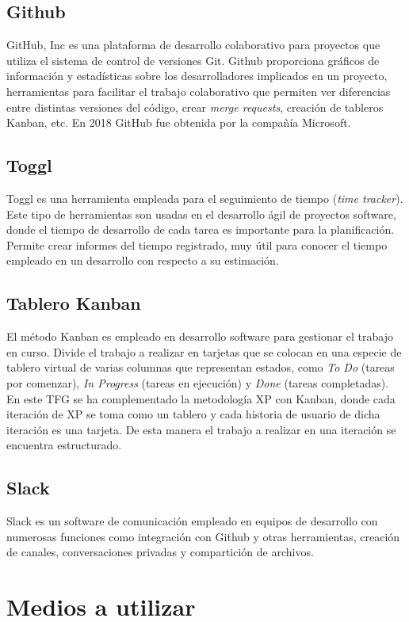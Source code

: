 \subsection{Github}
GitHub, Inc es una plataforma de desarrollo colaborativo para proyectos que utiliza el sistema de control de versiones Git. Github proporciona gráficos de información y estadísticas sobre los desarrolladores implicados en un proyecto, herramientas para facilitar el trabajo colaborativo que permiten ver diferencias entre distintas versiones del código, crear \textit{merge requests}, creación de tableros Kanban, etc. En 2018 GitHub fue obtenida por la compañía Microsoft.
\subsection{Toggl}
Toggl es una herramienta empleada para el seguimiento de tiempo (\textit{time tracker}). Este tipo de herramientas son usadas en el desarrollo ágil de proyectos software, donde el tiempo de desarrollo de cada tarea es importante para la planificación. Permite crear informes del tiempo registrado, muy útil para conocer el tiempo empleado en un desarrollo con respecto a su estimación.
\subsection{Tablero Kanban}
El método Kanban es empleado en desarrollo software para gestionar el trabajo en curso. Divide el trabajo a realizar en tarjetas que se colocan en una especie de tablero virtual de varias columnas que representan estados, como \textit{To Do} (tareas por comenzar), \textit{In Progress} (tareas en ejecución) y \textit{Done} (tareas completadas). En este \gls{TFG} se ha complementado la metodología \gls{XP} con Kanban, donde cada iteración de \gls{XP} se toma como un tablero y cada historia de usuario de dicha iteración es una tarjeta. De esta manera el trabajo a realizar en una iteración se encuentra estructurado.
\subsection{Slack}
Slack es un software de comunicación empleado en equipos de desarrollo con numerosas funciones como integración con Github y otras herramientas, creación de canales, conversaciones privadas y compartición de archivos.
\section{Medios a utilizar}
